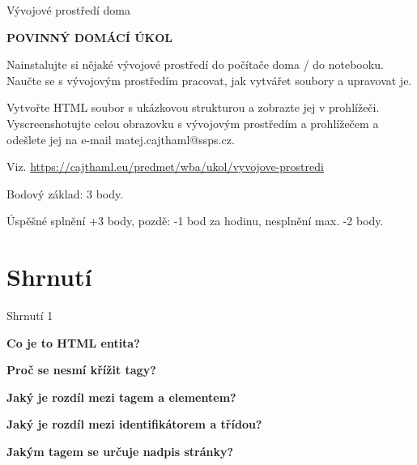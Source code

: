 \documentclass[aspectratio=169]{beamer}
\begin{document}
\begin{frame}{Vývojové prostředí doma}
    \begin{cardTiny}
        \begin{center}
            \textbf{POVINNÝ DOMÁCÍ ÚKOL}
        \end{center}
        \begin{flushleft}
            Nainstalujte si nějaké vývojové prostředí do počítače doma / do notebooku. Naučte se s vývojovým prostředím pracovat, jak vytvářet soubory a upravovat je.

            Vytvořte HTML soubor s ukázkovou strukturou a zobrazte jej v prohlížeči. Vyscreenshotujte celou obrazovku s vývojovým prostředím a prohlížečem a odešlete jej na e-mail matej.cajthaml@ssps.cz. 
            
            \vspace{2ex}
            Viz. \href{https://cajthaml.eu/predmet/wba/ukol/vyvojove-prostredi}{https://cajthaml.eu/predmet/wba/ukol/vyvojove-prostredi}

            Bodový základ: 3 body.

            Úspěšné splnění +3 body, pozdě: -1 bod za hodinu, nesplnění max. -2 body. 
        \end{flushleft}
    \end{cardTiny}
\end{frame}



\section{Shrnutí}
\begin{frame}{Shrnutí 1}
    \begin{cardTiny}
        \begin{center}
            \textbf{Co je to HTML entita?}
        \end{center}
    \end{cardTiny}
    \begin{cardTiny}
        \begin{center}
            \textbf{Proč se nesmí křížit tagy?}
        \end{center}
    \end{cardTiny}
    \begin{cardTiny}
        \begin{center}
            \textbf{Jaký je rozdíl mezi tagem a elementem?}
        \end{center}
    \end{cardTiny}
    \begin{cardTiny}
        \begin{center}
            \textbf{Jaký je rozdíl mezi identifikátorem a třídou?}
        \end{center}
    \end{cardTiny}
    \begin{cardTiny}
        \begin{center}
            \textbf{Jakým tagem se určuje nadpis stránky?}
        \end{center}
    \end{cardTiny}
\end{frame}
\end{document}
